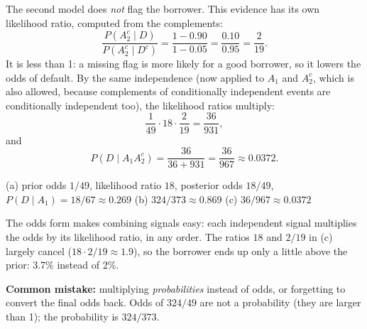 \begin{solution}
	 The second model does \emph{not} flag the
	borrower. This evidence has its own likelihood ratio, computed from the
	complements:
	\[ \frac{P(A_2^c\mid D)}{P(A_2^c\mid D^c)}=\frac{1-0.90}{1-0.05}
		=\frac{0.10}{0.95}=\frac{2}{19}. \]
	It is less than 1: a missing flag is more likely for a good borrower, so it
	lowers the odds of default. By the same independence (now applied to $A_1$
	and $A_2^c$, which is also allowed, because complements of conditionally
	independent events are conditionally independent too), the likelihood
	ratios multiply:
	\[ \frac{1}{49}\cdot18\cdot\frac{2}{19}=\frac{36}{931}, \]
	and
	\[ P(D\mid A_1A_2^c)=\frac{36}{36+931}=\frac{36}{967}\approx0.0372. \]
	\begin{answer}
		(a) prior odds $1/49$, likelihood ratio $18$, posterior odds $18/49$,
		$P(D\mid A_1)=18/67\approx0.269$ \quad (b) $324/373\approx0.869$ \quad
		(c) $36/967\approx0.0372$
	\end{answer}
	\begin{remark}
		The odds form makes combining signals easy: each independent signal
		multiplies the odds by its likelihood ratio, in any order. The ratios
		$18$ and $2/19$ in (c) largely cancel ($18\cdot2/19\approx1.9$), so the
		borrower ends up only a little above the prior: 3.7\% instead of 2\%.

		\textbf{Common mistake:} multiplying \emph{probabilities} instead of
		odds, or forgetting to convert the final odds back. Odds of $324/49$
		are not a probability (they are larger than 1); the probability is
		$324/373$.
	\end{remark}
\end{solution}
